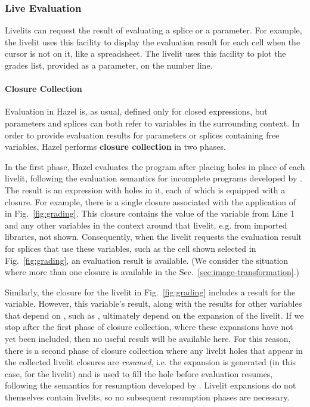 \subsubsection{Live Evaluation}\label{sec:live-evaluation}
Livelits can request the result of evaluating a splice or a parameter.
For example, the  livelit uses this facility to display
the evaluation result for each cell when the cursor is not on it, like a spreadsheet.
The  livelit uses this facility to plot the grades list, provided
as a parameter, on the number line.

\paragraph{Closure Collection} Evaluation in Hazel is, as usual, defined only for closed expressions,
but parameters and splices can both refer to variables in the surrounding
context. In order to provide evaluation results for parameters or splices containing free variables,
Hazel performs \textbf{closure collection} in two phases.

In the first phase, Hazel evaluates the program after placing holes in place of each livelit,
following the evaluation semantics for incomplete programs developed by \citet{HazelnutLive}.
The result is an expression with holes in it, each of which is equipped with a closure.
For example, there is a single closure associated with the application of  in Fig.~\ref{fig:grading}.
This closure contains the value of the  variable from Line 1 and any other variables in the context
around that livelit, e.g.
from imported libraries, not shown. Consequently, when the livelit requests the evaluation result for
splices that use these variables, such as the cell shown selected in Fig.~\ref{fig:grading},
an evaluation result is available. (We consider the situation where more than one closure is available
in the Sec.~\ref{sec:image-transformation}.)

Similarly, the closure for the  livelit in Fig.~\ref{fig:grading} includes a result for
the  variable. However, this variable's result, along with the
results for other variables that depend on , such as , ultimately depend on the
expansion of the  livelit. If we stop after the first phase of closure collection,
where these expansions have not yet been included,
then no useful result will be available here.
For this reason, there is a second phase of closure collection where any livelit holes that appear
in the collected livelit closures are \emph{resumed}, i.e. the expansion is generated
(in this case, for the  livelit) and is used to fill
the hole before evaluation resumes, following the semantics for resumption developed by \citet{HazelnutLive}.
Livelit expansions do not themselves contain livelits, so no subsequent resumption phases are necessary.

